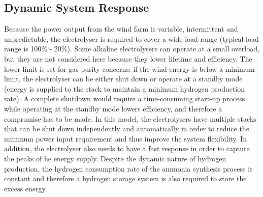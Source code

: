 \documentclass[11pt, a4paper]{article}
\begin{document}
\subsection{Dynamic System Response}
Because the power output from the wind farm is variable, intermittent and unpredictable, the electrolyser is required to cover a wide load range (typical load range is 100\% - 20\%\cite{gas}). Some alkaline electrolysers can operate at a small overload, but they are not considered here because they lower lifetime and efficiency. The lower limit is set for gas purity concerns: if the wind energy is below a minimum limit, the electrolyser can be either shut down or operate at a standby mode (energy is supplied to the stack to maintain a minimum hydrogen production rate).\cite{gas} A complete shutdown would require a time-consuming start-up process while operating at the standby mode lowers efficiency, and therefore a compromise has to be made. In this model, the electrolysers have multiple stacks that can be shut down independently and automatically in order to reduce the minimum power input requirement and thus improve the system flexibility.  In addition, the electrolyser also needs to have a fast response in order to capture the peaks of he energy supply. Despite the dynamic nature of hydrogen production, the hydrogen consumption rate of the ammonia synthesis process is constant and therefore a hydrogen storage system is also required to store the excess energy. 
\end{document}
